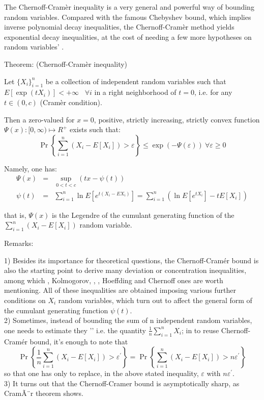 \documentclass[12pt]{article}
\begin{document}
The Chernoff-Cram\`{e}r inequality is a very general and powerful way of bounding random variables. Compared with the famous Chebyshev bound, which implies inverse polynomial decay inequalities, the Chernoff-Cram\`{e}r method yields exponential decay inequalities, at the cost of  needing a few more
hypotheses on random variables' .


Theorem: (Chernoff-Cram\`{e}r inequality)

Let $\{X_{i}\}_{i=1}^{n}$ be a collection of independent random
variables such that $E[\exp \left( tX_{i}\right) ]<+\infty $ \ $\forall i$ in a right neighborhood of $t=0$, i.e. for any $t\in(0,c)$ (Cram\`{e}r condition).

Then a zero-valued for $x=0$, positive, strictly increasing, strictly convex function $\Psi (x):[0,\infty )\mapsto R^{+}$ exists
such that: \\
\[
\Pr\left\{ \sum_{i=1}^{n}\left( X_{i}-E[X_{i}]\right) >\varepsilon \right\}
\leq \exp \left( -\Psi (\varepsilon )\right) \ \forall \varepsilon \geq 0
\]

Namely, one has:
\begin{eqnarray*}
\Psi (x) &=&\sup_{0 < t < c}\left( tx -\psi (t)\right)  \\
\psi (t) &=&\sum_{i=1}^{n}\ln E\left[ e^{t\left( X_{i}-EX_{i}\right) }\right]
=\sum_{i=1}^{n}\left(\ln E\left[ e^{tX_{i}}\right] -tE\left[ X_{i}\right]\right)
\end{eqnarray*}

that is, $\Psi (x)$ is the Legendre  of the cumulant generating function of the $\sum_{i=1}^{n}\left( X_{i}-E[X_{i}]\right)$ random variable.

Remarks:

1) Besides its importance for theoretical questions, the Chernoff-Cram\'{e}r bound is also the starting point to derive many deviation
or concentration inequalities, among which , Kolmogorov, , ,
Hoeffding and Chernoff ones are worth mentioning. All of these
inequalities are obtained imposing various further conditions on $X_{i}$ random variables, which turn out to affect the general form of the cumulant generating function $\psi(t)$. \\
2) Sometimes, instead of bounding the sum of n independent random variables, one needs to estimate they '' i.e. the quantity $\frac{1}{n}\sum_{i=1}^{n}X_i$; in  to reuse Chernoff-Cram\'{e}r bound, it's enough to note that
\[
\Pr\left\{\frac{1}{n}\sum_{i=1}^{n}\left( X_{i}-E[X_{i}]\right) >\varepsilon^{\prime}\right\}=\Pr\left\{\sum_{i=1}^{n}\left( X_{i}-E[X_{i}]\right) >n\varepsilon^{\prime}\right\}
\]
so that one has only to replace, in the above stated inequality, $\varepsilon$ with $n\varepsilon^{\prime}$.
\\
3) It turns out that the Chernoff-Cramer bound is asymptotically sharp, as CramÃ¨r  theorem shows.
\end{document}
